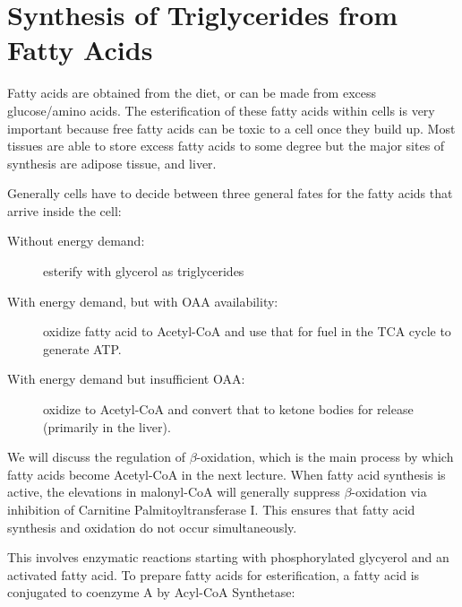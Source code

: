 \documentclass{tufte-handout}
\begin{document}
\section{Synthesis of Triglycerides from Fatty Acids}

Fatty acids are obtained from the diet, or can be made from excess glucose/amino acids.  The esterification of these fatty acids within cells is very important because free fatty acids can be toxic to a cell once they build up.  Most tissues are able to store excess fatty acids to some degree but the major sites of synthesis are adipose tissue, and liver.

Generally cells have to decide between three general fates for the fatty acids that arrive inside the cell:
\begin{description}
\item [Without energy demand:] esterify with glycerol as triglycerides
\item [With energy demand, but with OAA availability:] oxidize fatty acid to Acetyl-CoA and use that for fuel in the TCA cycle to generate ATP.
\item [With energy demand but insufficient OAA:] oxidize to Acetyl-CoA and convert that to ketone bodies for release (primarily in the liver).
\end{description}

We will discuss the regulation of $\beta$-oxidation, which is the main process by which fatty acids become Acetyl-CoA in the next lecture.  When fatty acid synthesis is active, the elevations in malonyl-CoA will generally suppress $\beta$-oxidation via inhibition of Carnitine Palmitoyltransferase I.  This ensures that fatty acid synthesis and oxidation do not occur simultaneously.

  This involves enzymatic reactions starting with phosphorylated glycyerol and an activated fatty acid.  To prepare fatty acids for esterification, a fatty acid is conjugated to coenzyme A by Acyl-CoA Synthetase:
\end{document}

